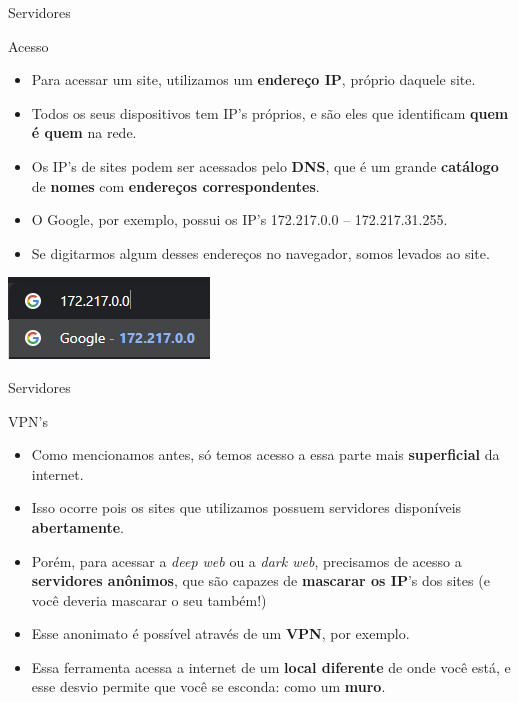 \begin{frame}{Servidores}
	\begin{block}{Acesso}
		\begin{itemize}
			\item Para acessar um site, utilizamos um \textbf{endereço IP}, próprio daquele site.
			\item Todos os seus dispositivos tem IP's próprios, e são eles que identificam \textbf{quem é quem} na rede.
			\item Os IP's de sites podem ser acessados pelo \textbf{DNS}, que é um grande \textbf{catálogo} de \textbf{nomes} com \textbf{endereços correspondentes}.
			\item O Google, por exemplo, possui os IP's 172.217.0.0 -- 172.217.31.255.
			\item Se digitarmos algum desses endereços no navegador, somos levados ao site.
		\end{itemize}
	\end{block}

	\centering
	\includegraphics[width=0.5\linewidth]{Figuras/Ch03/fig9}
\end{frame}


\begin{frame}{Servidores}
	\begin{block}{VPN's}
		\begin{itemize}
			\item Como mencionamos antes, só temos acesso a essa parte mais \textbf{superficial} da internet.
			\item Isso ocorre pois os sites que utilizamos possuem servidores disponíveis \textbf{abertamente}.
			\item Porém, para acessar a \textit{deep web} ou a \textit{dark web}, precisamos de acesso a \textbf{servidores anônimos}, que são capazes de \textbf{mascarar os IP}'s dos sites (e você deveria mascarar o seu também!)
			\item Esse anonimato é possível através de um \textbf{VPN}, por exemplo.
			\item Essa ferramenta acessa a internet de um \textbf{local diferente} de onde você está, e esse desvio permite que você se esconda: como um \textbf{muro}.
		\end{itemize}
	\end{block}

\end{frame}


